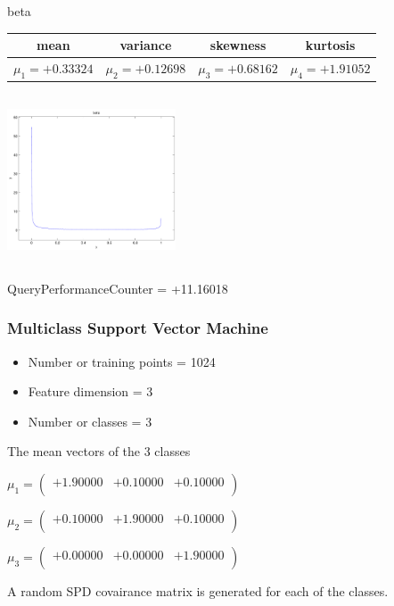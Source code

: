\documentclass[9pt]{article}
\theoremstyle{plain}
\theoremstyle{definition}
\theoremstyle{remark}
\numberwithin{equation}{section}
\begin{document}
\newpage
beta \begin{tabular}{|c|c|c|c|}  mean & variance & skewness & kurtosis \\  \hline
$\mu_1 = +0.33324$ & $\mu_2 = +0.12698$ & $\mu_3 = +0.68162$ & $\mu_4 =+1.91052$ \\
\end{tabular}

\includegraphics[width=5cm,height=5cm]{beta.pdf}

QueryPerformanceCounter  =  +11.16018
\subsubsection{Multiclass Support Vector Machine }
\begin{itemize}
\item Number or training points = 1024
\item Feature dimension = 3
\item Number or classes = 3
\end{itemize}
{The mean vectors of the 3 classes}

$\mu_1 = \left(
\begin{array}{
ccc}
+1.90000 & +0.10000 & +0.10000 \\
\end{array}
\right)$ \newline 

$\mu_2 = \left(
\begin{array}{
ccc}
+0.10000 & +1.90000 & +0.10000 \\
\end{array}
\right)$ \newline 

$\mu_3 = \left(
\begin{array}{
ccc}
+0.00000 & +0.00000 & +1.90000 \\
\end{array}
\right)$ \newline 

A random SPD covairance matrix is generated for each of the classes.\newline
\end{document}
